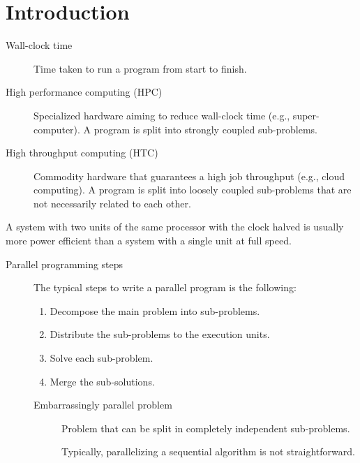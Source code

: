 \chapter{Introduction}

\begin{description}
    \item[Wall-clock time] 
        Time taken to run a program from start to finish.

    \item[High performance computing (HPC)] 
        Specialized hardware aiming to reduce wall-clock time (e.g., super-computer). A program is split into strongly coupled sub-problems.

    \item[High throughput computing (HTC)]  
        Commodity hardware that guarantees a high job throughput (e.g., cloud computing). A program is split into loosely coupled sub-problems that are not necessarily related to each other.
\end{description}

\begin{remark}
    A system with two units of the same processor with the clock halved is usually more power efficient than a system with a single unit at full speed.
\end{remark}

\begin{description}
    \item[Parallel programming steps] 
        The typical steps to write a parallel program is the following:
        \begin{enumerate}
            \item Decompose the main problem into sub-problems.
            \item Distribute the sub-problems to the execution units.
            \item Solve each sub-problem.
            \item Merge the sub-solutions.
        \end{enumerate}

        \begin{description}
            \item[Embarrassingly parallel problem] 
                Problem that can be split in completely independent sub-problems.

            \begin{remark}
                Typically, parallelizing a sequential algorithm is not straightforward.
            \end{remark}
        \end{description}
\end{description}